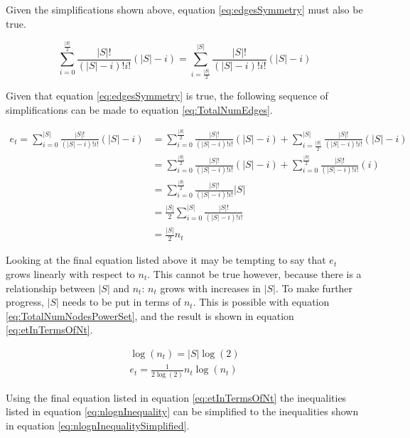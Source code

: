\documentclass{article}
\begin{document}
Given the simplifications shown above, equation \ref{eq:edgesSymmetry} must also be true.

\begin{equation}
    \sum_{i=0}^{\frac{|S|}{2}}\frac{|S|!}{(|S|-i)!i!}\left(|S|-i\right)=
    \sum_{i=\frac{|S|}{2}}^{|S|}\frac{|S|!}{(|S|-i)!i!}\left(|S|-i\right)
    \label{eq:edgesSymmetry}
\end{equation}

Given that equation \ref{eq:edgesSymmetry} is true, the following sequence of simplifications can be made to equation \ref{eq:TotalNumEdges}.

\begin{equation*}
    \begin{split}
        e_t=\sum_{i=0}^{|S|}\frac{|S|!}{(|S|-i)!i!}\left(|S|-i\right)&=
        \sum_{i=0}^{\frac{|S|}{2}}\frac{|S|!}{(|S|-i)!i!}\left(|S|-i\right)+
        \sum_{i=\frac{|S|}{2}}^{|S|}\frac{|S|!}{(|S|-i)!i!}\left(|S|-i\right)
        \\
        &=
        \sum_{i=0}^{\frac{|S|}{2}}\frac{|S|!}{(|S|-i)!i!}\left(|S|-i\right)+
        \sum_{i=0}^{\frac{|S|}{2}}\frac{|S|!}{(|S|-i)!i!}\left(i\right)
        \\
        &=
        \sum_{i=0}^{\frac{|S|}{2}}\frac{|S|!}{(|S|-i)!i!}|S|
        \\
        &=
        \frac{|S|}{2}\sum_{i=0}^{|S|}\frac{|S|!}{(|S|-i)!i!}
        \\
        &=
        \frac{|S|}{2}n_t
    \end{split}
\end{equation*}

Looking at the final equation listed above it may be tempting to say that $e_t$ grows linearly with respect to $n_t$. This cannot be true however, because there is a relationship between $|S|$ and $n_t$: $n_t$ grows with increases in $|S|$. To make further progress, $|S|$ needs to be put in terms of $n_t$. This is possible with equation \ref{eq:TotalNumNodesPowerSet}, and the result is shown in equation \ref{eq:etInTermsOfNt}.

\begin{equation}
    \begin{split}
        \log(n_t)=|S|\log(2) \\
        e_t=\frac{1}{2\log(2)}n_t\log(n_t)
    \end{split}
    \label{eq:etInTermsOfNt}
\end{equation}

Using the final equation listed in equation \ref{eq:etInTermsOfNt} the inequalities listed in equation \ref{eq:nlognInequality} can be simplified to the inequalities shown in equation \ref{eq:nlognInequalitySimplified}.
\end{document}
